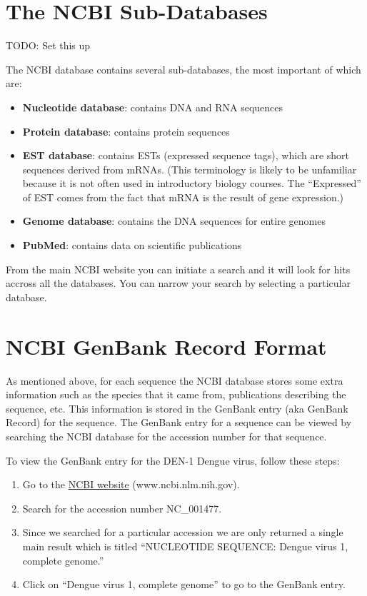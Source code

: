\documentclass[
]{book}
\providecommand{\tightlist}{%
  \setlength{\itemsep}{0pt}\setlength{\parskip}{0pt}}
\begin{document}
\hypertarget{the-ncbi-sub-databases}{%
\section{The NCBI Sub-Databases}\label{the-ncbi-sub-databases}}

TODO: Set this up

The NCBI database contains several sub-databases, the most important of which are:

\begin{itemize}
\tightlist
\item
  \textbf{Nucleotide database}: contains DNA and RNA sequences
\item
  \textbf{Protein database}: contains protein sequences
\item
  \textbf{EST database}: contains ESTs (expressed sequence tags), which are short sequences derived from mRNAs. (This terminology is likely to be unfamiliar because it is not often used in introductory biology courses. The ``Expressed'' of EST comes from the fact that mRNA is the result of gene expression.)
\item
  \textbf{Genome database}: contains the DNA sequences for entire genomes
\item
  \textbf{PubMed}: contains data on scientific publications
\end{itemize}

From the main NCBI website you can initiate a search and it will look for hits accross all the databases. You can narrow your search by selecting a particular database.

\hypertarget{ncbi-genbank-record-format}{%
\section{NCBI GenBank Record Format}\label{ncbi-genbank-record-format}}

As mentioned above, for each sequence the NCBI database stores some extra information such as the species that it came from, publications describing the sequence, etc. This information is stored in the GenBank entry (aka GenBank Record) for the sequence. The GenBank entry for a sequence can be viewed by searching the NCBI database for the accession number for that sequence.

To view the GenBank entry for the DEN-1 Dengue virus, follow these steps:

\begin{enumerate}
\def\labelenumi{\arabic{enumi}.}
\tightlist
\item
  Go to the \href{www.ncbi.nlm.nih.gov}{NCBI website} (www.ncbi.nlm.nih.gov).
\item
  Search for the accession number NC\_001477.
\item
  Since we searched for a particular accession we are only returned a single main result which is titled ``NUCLEOTIDE SEQUENCE: Dengue virus 1, complete genome.''
\item
  Click on ``Dengue virus 1, complete genome'' to go to the GenBank entry.
\end{enumerate}
\end{document}
